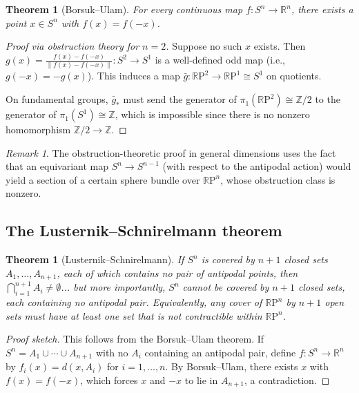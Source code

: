 \documentclass[12pt,a4paper,openany]{book}
\theoremstyle{definition}
\theoremstyle{plain}
\newtheorem{theorem}[definition]{Theorem}
\theoremstyle{remark}
\newtheorem{remark}[definition]{Remark}
\newcommand{\Z}{\mathbb{Z}}
\newcommand{\R}{\mathbb{R}}
\newcommand{\RP}{\mathbb{R}\mathrm{P}}
\begin{document}
\begin{theorem}[Borsuk--Ulam]\label{thm:borsuk-ulam}
For every continuous map $f\colon S^n\to\R^n$, there exists a point
$x\in S^n$ with $f(x)=f(-x)$.
\end{theorem}

\begin{proof}[Proof via obstruction theory for $n=2$]
Suppose no such $x$ exists.  Then
$g(x)=\frac{f(x)-f(-x)}{\|f(x)-f(-x)\|}\colon S^2\to S^1$ is a
well-defined odd map (i.e., $g(-x)=-g(x)$).  This induces a map
$\bar g\colon\RP^2\to\RP^1\cong S^1$ on quotients.

On fundamental groups, $\bar g_*$ must send the generator of
$\pi_1(\RP^2)\cong\Z/2$ to the generator of $\pi_1(S^1)\cong\Z$,
which is impossible since there is no nonzero homomorphism
$\Z/2\to\Z$.
\end{proof}

\begin{remark}
The obstruction-theoretic proof in general dimensions uses the fact
that an equivariant map $S^n\to S^{n-1}$ (with respect to the
antipodal action) would yield a section of a certain sphere bundle
over $\RP^n$, whose obstruction class is nonzero.
\end{remark}

\subsection{The Lusternik--Schnirelmann theorem}

\begin{theorem}[Lusternik--Schnirelmann]
\label{thm:lusternik-schnirelmann}
If $S^n$ is covered by $n+1$ closed sets $A_1,\dots,A_{n+1}$, each
of which contains no pair of antipodal points, then
$\bigcap_{i=1}^{n+1}A_i\ne\emptyset$... but more importantly, $S^n$
cannot be covered by $n+1$ closed sets, each containing no antipodal
pair.  Equivalently, any cover of $\RP^n$ by $n+1$ open sets must have
at least one set that is not contractible within $\RP^n$.
\end{theorem}

\begin{proof}[Proof sketch]
This follows from the Borsuk--Ulam theorem.  If
$S^n = A_1\cup\cdots\cup A_{n+1}$ with no $A_i$ containing an
antipodal pair, define $f\colon S^n\to\R^n$ by
$f_i(x)=d(x,A_i)$ for $i=1,\dots,n$.  By Borsuk--Ulam, there exists
$x$ with $f(x)=f(-x)$, which forces $x$ and $-x$ to lie in
$A_{n+1}$, a contradiction.
\end{proof}
\end{document}
